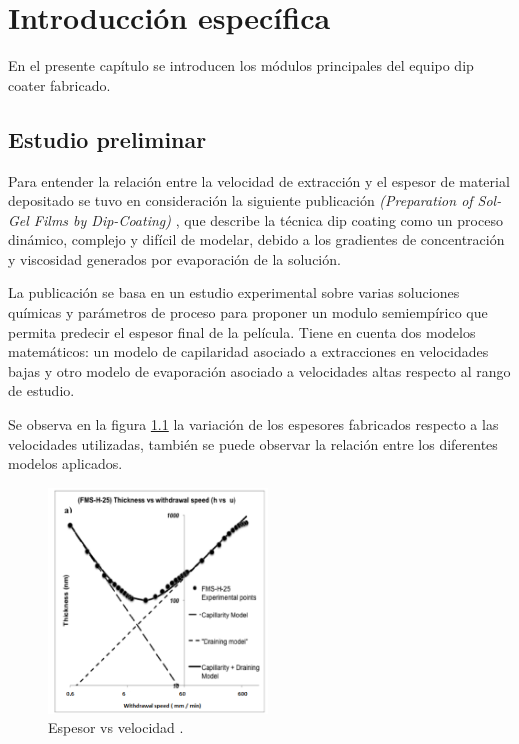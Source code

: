 
\chapter{Introducción específica} %

\label{Chapter2} %

En el presente capítulo se introducen los módulos principales del equipo dip coater fabricado.   

\section{Estudio preliminar}

Para entender la relación entre la velocidad de extracción y el espesor de material depositado se tuvo en consideración la siguiente publicación \textit{(Preparation of Sol-Gel Films by Dip-Coating)} \cite{paper_galo}, que describe la técnica dip coating como un proceso dinámico, complejo y difícil de modelar, debido a los gradientes de concentración y viscosidad generados por evaporación de la solución. 


La publicación se basa en un estudio experimental sobre varias soluciones químicas y parámetros de proceso para proponer un modulo semiempírico que permita predecir el espesor final de la película. Tiene en cuenta dos modelos matemáticos: un modelo de capilaridad asociado a extracciones en velocidades bajas y otro modelo de evaporación asociado a velocidades altas respecto al rango de estudio. 

Se observa en la figura \ref{fig:paper_galo} la variación de los espesores fabricados respecto a las velocidades utilizadas, también se puede observar la relación entre los diferentes modelos aplicados. 

\begin{figure}[!h]
\centering 
\includegraphics[width=0.52\textwidth]{./Figures/paper_galo.png}
\caption{Espesor vs velocidad \protect\footnotemark.}
\label{fig:paper_galo}
\end{figure}

